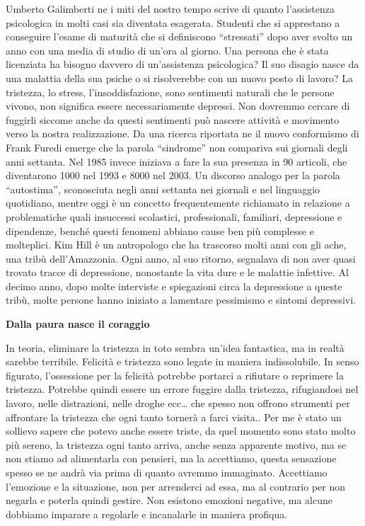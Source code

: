 \documentclass[12pt]{book} %
\begin{document}
\begin{mdframed}[linewidth=1pt]
Umberto Galimberti ne i miti del nostro tempo scrive di quanto
l'assistenza psicologica in molti casi sia diventata esagerata. Studenti che si apprestano a
conseguire l'esame di maturità che si definiscono “stressati” dopo aver svolto un anno con una
media di studio di un'ora al giorno. Una persona che è stata licenziata ha bisogno davvero di
un'assistenza psicologica? Il suo disagio nasce da una malattia della sua psiche o si risolverebbe
con un nuovo posto di lavoro? La tristezza, lo stress, l'insoddisfazione, sono sentimenti naturali che le persone vivono, non significa essere necessariamente depressi. Non dovremmo cercare di fuggirli siccome anche da questi
sentimenti può nascere attività e movimento verso la nostra realizzazione. Da una ricerca riportata ne il nuovo
conformismo di Frank
Furedi emerge che la parola “sindrome” non compariva sui giornali degli anni settanta. Nel 1985 invece iniziava a fare
la sua presenza in 90 articoli, che diventarono 1000 nel 1993 e 8000 nel 2003. Un discorso analogo per la parola
“autostima”, sconosciuta negli anni settanta nei giornali e nel linguaggio quotidiano, mentre oggi è un concetto frequentemente richiamato in relazione a problematiche quali insuccessi scolastici, professionali, familiari, depressione e dipendenze, benché questi fenomeni abbiano cause ben più complesse e molteplici. Kim Hill è un
antropologo che ha trascorso molti anni con gli ache, una tribù dell'Amazzonia. Ogni anno, al suo
ritorno, segnalava di non aver quasi trovato tracce di depressione, nonostante la vita dure e le malattie infettive. Al
decimo anno, dopo molte interviste e spiegazioni circa la depressione a queste tribù, molte persone hanno iniziato a
lamentare pessimismo e sintomi depressivi.
\end{mdframed}

\textbf{Dalla paura nasce il coraggio}

In teoria, eliminare la tristezza in toto sembra un'idea fantastica, ma in realtà sarebbe terribile. Felicità e
tristezza sono legate in maniera indissolubile. In senso figurato, l’ossessione per la felicità potrebbe portarci a rifiutare o reprimere la tristezza. Potrebbe quindi essere un errore fuggire dalla tristezza,
rifugiandosi nel lavoro, nelle distrazioni, nelle droghe ecc… che spesso non offrono strumenti per affrontare la tristezza che ogni
tanto tornerà a farci visita.. Per me è stato un sollievo sapere che potevo anche essere triste, da quel momento sono
stato molto più sereno, la tristezza ogni tanto arriva, anche senza apparente motivo, ma se non stiamo ad alimentarla
con pensieri, ma la accettiamo, questa sensazione spesso se ne andrà via prima di quanto avremmo immaginato. Accettiamo
l'emozione e la situazione, non per arrenderci ad essa, ma al contrario per non negarla e poterla quindi gestire.
Non esistono emozioni negative, ma alcune dobbiamo imparare a regolarle e incanalarle in maniera profiqua.
\end{document}
